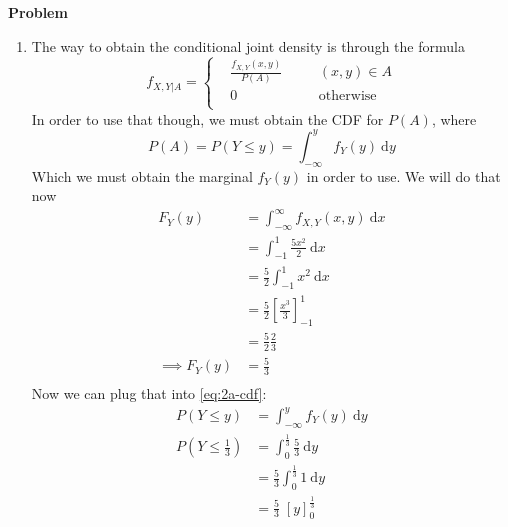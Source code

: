 \documentclass[12pt]{article}
\newenvironment{Ex}{\textbf{Problem}\vspace{.75em}\\}{}
\newcommand{\dd}[1]{\:\mathrm{d}{#1}}
\begin{document}
\begin{enumerate}
\begin{Ex}
\begin{solution}
      \begin{enumerate}
      \item The way to obtain the conditional joint density is through
        the formula
        \begin{equation}
          \label{eq:2a-conditional-joint-density}
          f_{X,Y|A} = \left\{
            \begin{aligned}
              & \frac{f_{X,Y}(x,y)}{P(A)} &&\quad(x,y) \in A \\
              & 0 &&\quad\text{otherwise} \\
            \end{aligned} \right.
        \end{equation}
        In order to use that though, we must obtain the CDF for
        $P(A)$, where
        \begin{equation}
          \label{eq:2a-cdf}
          P(A) = P(Y \le y) = \int_{-\infty}^{y} f_{Y}(y) \dd{y}
        \end{equation}
        Which we must obtain the marginal $f_Y(y)$ in order to use. We
        will do that now
        \begin{equation}
          \label{eq:2a-marginal}
          \begin{aligned}
            F_Y(y) &= \int_{-\infty}^{\infty} f_{X,Y}(x,y) \dd{x} \\
            &= \int_{-1}^1 \frac{5x^2}{2} \dd{x} \\
            &= \frac{5}{2} \int_{-1}^{1} x^2 \dd{x} \\
            &= \frac{5}{2} \left[\frac{x^3}{3}\right]_{-1}^1 \\
            &= \frac{5}{2} \frac{2}{3} \\
            \implies F_Y(y) &= \frac{5}{3} \\
          \end{aligned}
        \end{equation}
        Now we can plug that into \cref{eq:2a-cdf}:
        \begin{equation}
          \label{eq:2a-cdf-plugged}
          \begin{aligned}
            P(Y \le y) &= \int_{-\infty}^{y} f_{Y}(y) \dd{y} \\
            P\left(Y \le \frac{1}{3}\right) &=
            \int_{0}^{\frac{1}{3}} \frac{5}{3} \dd{y} \\
            &= \frac{5}{3} \int_{0}^{\frac{1}{3}} 1 \dd{y} \\
            &= \frac{5}{3} \; [y]_0^{\frac{1}{3}} \\

\end{aligned}
\end{equation}
\end{enumerate}
\end{solution}
\end{Ex}
\end{enumerate}
\end{document}
